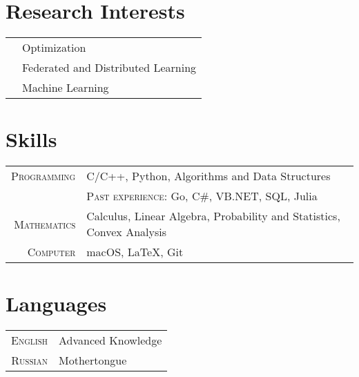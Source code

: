 \section{Research Interests}
\begin{tabular}{cl}
	\qquad\qquad&  Optimization\\
	& Federated and Distributed Learning\\
	&  Machine Learning
\end{tabular}

\section{Skills}

\begin{tabular}{rl}
	\textsc{Programming} & C/C++, Python, Algorithms and Data Structures\\& \textsc{Past experience:} Go, C\#, VB.NET, SQL, Julia\\
	\textsc{Mathematics} & Calculus, Linear Algebra, Probability and Statistics, Convex Analysis\\
	\textsc{Computer} & macOS, LaTeX, Git\\
\end{tabular}

\section{Languages}

\begin{tabular}{rl}
	\textsc{English} & Advanced Knowledge \\
	\textsc{Russian} & Mothertongue\\
\end{tabular}